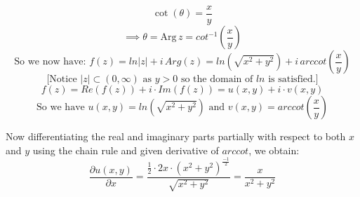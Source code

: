 \documentclass[12pt]{article}
\begin{document}
\begin{center}
\end{center}

\[
\cot\left(\theta\right) = \frac{x}{y}
\]
\[
\implies \theta = \text{Arg} \, z = cot^{-1}\left(\frac{x}{y}\right)
\]
\[
\text{So we now have: } f(z) = ln|z| + i\,Arg\left(z\right) = ln\left(\sqrt{x^2 + y^2}\right) + i\,arccot\left(\frac{x}{y}\right)
\]
\[
\text{[Notice } |z| \subset \left(0,\infty\right) \text{ as } y > 0 \text{ so the domain of } ln \text{ is satisfied.]}
\]
\[
f(z) = Re\left(f(z)\right) + i \cdot Im\left(f(z)\right) = u(x,y) + i \cdot v(x,y)
\]
\[
\text{So we have }u(x,y) = ln\left(\sqrt{x^2 + y^2}\right) \text{ and } v(x,y) = arccot\left(\frac{x}{y}\right)
\]

\noindent Now differentiating the real and imaginary parts partially with respect to both \(x\) and \(y\) using the chain rule and given derivative of \(arccot\), we obtain:
\[
\frac{\partial u(x,y)}{\partial x} = \frac{\frac{1}{2} \cdot 2x\cdot \left(x^2+y^2\right)^{\frac{-1}{2}}}{\sqrt{x^2+y^2}} = \frac{x}{x^2+y^2}
\]
\end{document}
